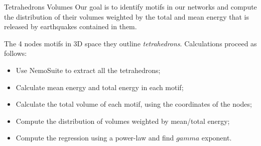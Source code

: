\begin{frame}{Tetrahedrons Volumes}
Our goal is to identify motifs in our networks and compute the distribution of their volumes weighted by the total and mean energy that is released by earthquakes contained in them.\par 

\vspace{5mm} 

The 4 nodes motifs in 3D space they outline {\it tetrahedrons}. Calculations proceed as follows:
\begin{itemize}
	\item Use NemoSuite to extract all the tetrahedrons;
	\item Calculate mean energy and total energy in each motif;
	\item Calculate the total volume of each motif, using the coordinates of the nodes;
	\item Compute the distribution of volumes weighted by mean/total energy;
	\item Compute the regression using a power-law and find $gamma$ exponent. 
\end{itemize}
\end{frame}




